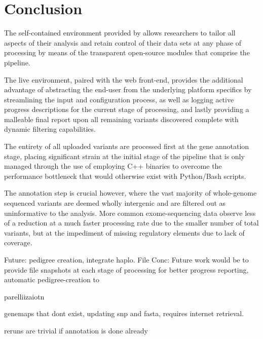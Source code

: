 \section{Conclusion}

The self-contained environment provided by \app allows researchers to tailor all aspects of their analysis and retain control of their data sets at any phase of processing by means of the transparent open-source modules that comprise the pipeline. 

The live environment, paired with the web front-end, provides the additional advantage of abstracting the end-user from the underlying platform specifics by streamlining the input and configuration process, as well as logging active progress descriptions for the current stage of processing, and lastly providing a malleable final report upon all remaining variants discovered complete with dynamic filtering capabilities.

The entirety of all uploaded variants are processed first at the gene annotation stage, placing significant strain at the initial stage of the pipeline that is only managed through the use of employing C++ binaries to overcome the performance bottleneck that would otherwise exist with Python/Bash scripts.

The annotation step is crucial however, where the vast majority of whole-genome sequenced variants are deemed wholly intergenic and are filtered out as uninformative to the analysis. More common exome-sequencing data observe less of a reduction at a much faster processing rate due to the smaller number of total variants, but at the impediment of missing regulatory elements due to lack of coverage.




Future: pedigree creation, integrate haplo. File 
Conc: Future work would be to provide file snapshots at each stage of processing for better progress reporting, automatic pedigree-creation to 

parelliizaiotn

genemaps that dont exist, updating snp and fasta, requires internet retrieval.

reruns are trivial if annotation is done already